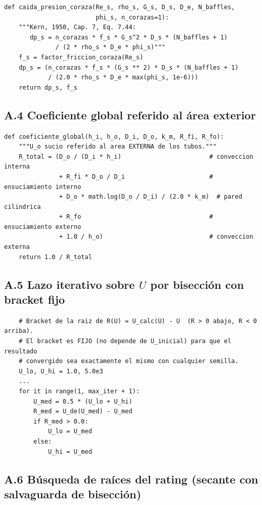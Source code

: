 \documentclass[11pt,a4paper]{article}
\begin{document}
\begin{verbatim}
def caida_presion_coraza(Re_s, rho_s, G_s, D_s, D_e, N_baffles,
                         phi_s, n_corazas=1):
    """Kern, 1950, Cap. 7, Eq. 7.44:
       dp_s = n_corazas * f_s * G_s^2 * D_s * (N_baffles + 1)
              / (2 * rho_s * D_e * phi_s)"""
    f_s = factor_friccion_coraza(Re_s)
    dp_s = (n_corazas * f_s * (G_s ** 2) * D_s * (N_baffles + 1)
            / (2.0 * rho_s * D_e * max(phi_s, 1e-6)))
    return dp_s, f_s
\end{verbatim}

\subsection*{A.4 Coeficiente global referido al \'area exterior}

\begin{verbatim}
def coeficiente_global(h_i, h_o, D_i, D_o, k_m, R_fi, R_fo):
    """U_o sucio referido al area EXTERNA de los tubos."""
    R_total = (D_o / (D_i * h_i)                        # conveccion interna
               + R_fi * D_o / D_i                       # ensuciamiento interno
               + D_o * math.log(D_o / D_i) / (2.0 * k_m)  # pared cilindrica
               + R_fo                                   # ensuciamiento externo
               + 1.0 / h_o)                             # conveccion externa
    return 1.0 / R_total
\end{verbatim}

\subsection*{A.5 Lazo iterativo sobre $U$ por bisecci\'on con bracket fijo}

\begin{verbatim}
    # Bracket de la raiz de R(U) = U_calc(U) - U  (R > 0 abajo, R < 0 arriba).
    # El bracket es FIJO (no depende de U_inicial) para que el resultado
    # convergido sea exactamente el mismo con cualquier semilla.
    U_lo, U_hi = 1.0, 5.0e3
    ...
    for it in range(1, max_iter + 1):
        U_med = 0.5 * (U_lo + U_hi)
        R_med = U_de(U_med) - U_med
        if R_med > 0.0:
            U_lo = U_med
        else:
            U_hi = U_med
\end{verbatim}

\subsection*{A.6 B\'usqueda de ra\'ices del rating (secante con salvaguarda de bisecci\'on)}
\end{document}
